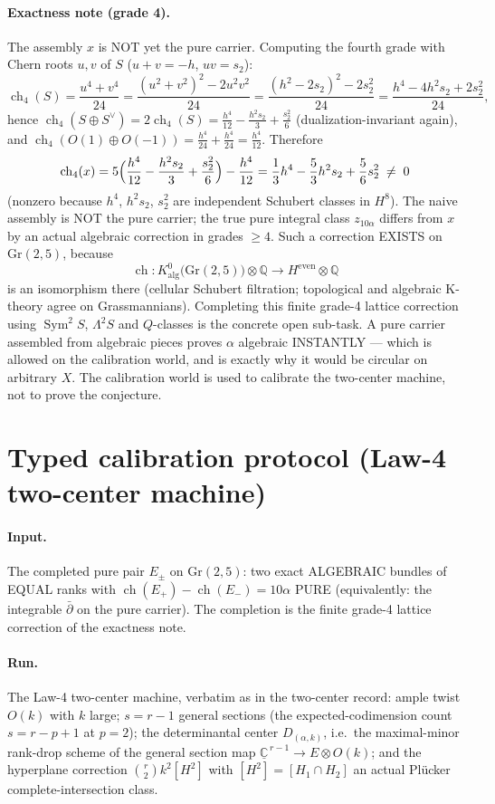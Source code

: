 \documentclass[11pt]{article}
\newcommand{\ch}{\operatorname{ch}}
\newcommand{\ddbar}{\bar\partial}
\begin{document}
\paragraph{Exactness note (grade 4).}
The assembly $x$ is NOT yet the pure carrier. Computing the fourth
grade with Chern roots $u,v$ of $S$ ($u+v=-h$, $uv=s_2$):
\[
  \ch_4(S)=\frac{u^4+v^4}{24}
  =\frac{(u^2+v^2)^2-2u^2v^2}{24}
  =\frac{(h^2-2s_2)^2-2s_2^2}{24}
  =\frac{h^4-4h^2s_2+2s_2^2}{24},
\]
hence
$\ch_4(S\oplus S^\vee)=2\ch_4(S)
=\frac{h^4}{12}-\frac{h^2s_2}{3}+\frac{s_2^2}{6}$
(dualization-invariant again), and
$\ch_4(O(1)\oplus O(-1))=\frac{h^4}{24}+\frac{h^4}{24}=\frac{h^4}{12}$.
Therefore
\[
  \ch_4(x)=5\Bigl(\frac{h^4}{12}-\frac{h^2s_2}{3}+\frac{s_2^2}{6}\Bigr)
       -\frac{h^4}{12}
  =\frac13 h^4-\frac53 h^2s_2+\frac56 s_2^2\;\neq\;0
\]
(nonzero because $h^4$, $h^2s_2$, $s_2^2$ are independent Schubert
classes in $H^8$). The naive assembly is NOT the pure carrier; the
true pure integral class $z_{10\alpha}$ differs from $x$ by an actual
algebraic correction in grades $\ge 4$. Such a correction EXISTS on
$\mathrm{Gr}(2,5)$, because
\[
  \ch: K^0_{\mathrm{alg}}\bigl(\mathrm{Gr}(2,5)\bigr)\otimes\mathbb Q
  \longrightarrow H^{\mathrm{even}}\otimes\mathbb Q
\]
is an isomorphism there (cellular Schubert filtration; topological and
algebraic K-theory agree on Grassmannians). Completing this finite
grade-4 lattice correction using $\operatorname{Sym}^2S$,
$\Lambda^2S$ and $Q$-classes is the concrete open sub-task. A pure
carrier assembled from algebraic pieces proves $\alpha$ algebraic
INSTANTLY --- which is allowed on the calibration world, and is exactly
why it would be circular on arbitrary $X$. The calibration world is
used to calibrate the two-center machine, not to prove the conjecture.

\section{Typed calibration protocol (Law-4 two-center machine)}
\paragraph{Input.}
The completed pure pair $E_\pm$ on $\mathrm{Gr}(2,5)$: two exact
ALGEBRAIC bundles of EQUAL ranks with
$\ch(E_+)-\ch(E_-)=10\alpha$ PURE (equivalently: the integrable
$\ddbar$ on the pure carrier). The completion is the finite grade-4
lattice correction of the exactness note.

\paragraph{Run.}
The Law-4 two-center machine, verbatim as in the two-center record:
ample twist $O(k)$ with $k$ large; $s=r-1$ general sections (the
expected-codimension count $s=r-p+1$ at $p=2$); the determinantal
center $D_{(\alpha,k)}$, i.e.\ the maximal-minor rank-drop scheme of
the general section map
$\underline{\mathbb C}^{\,r-1}\to E\otimes O(k)$; and the hyperplane
correction $\binom r2 k^2[H^2]$ with $[H^2]=[H_1\cap H_2]$ an actual
Pl\"ucker complete-intersection class.
\end{document}
